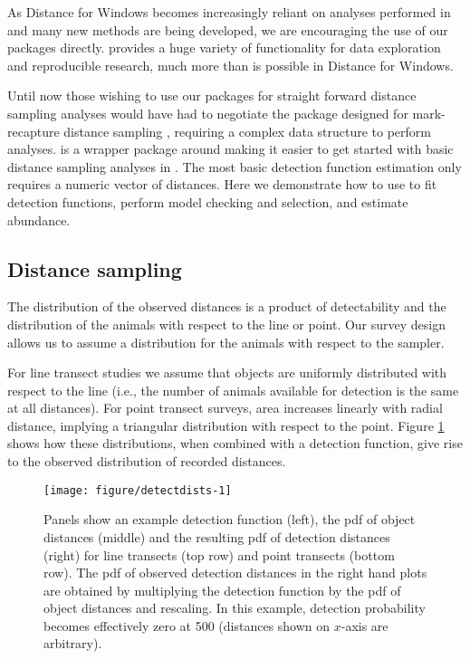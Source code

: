 \documentclass[article]{jss}\usepackage[]{graphicx}\usepackage[]{color}
\makeatletter
\def\maxwidth{ %
  \ifdim\Gin@nat@width>\linewidth
    \linewidth
  \else
    \Gin@nat@width
  \fi
}
\makeatother
\begin{document}
As Distance for Windows becomes increasingly reliant on analyses performed in  and many new methods are being developed, we are encouraging the use of our  packages directly.  provides a huge variety of functionality for data exploration and reproducible research, much more than is possible in Distance for Windows.

Until now those wishing to use our  packages for straight forward distance sampling analyses would have had to negotiate the package  \citep{mrds-pkg} designed for mark-recapture distance sampling \citep{Burt:2014gu}, requiring a complex data structure to perform analyses.  is a wrapper package around  making it easier to get started with basic distance sampling analyses in . The most basic detection function estimation only requires a numeric vector of distances. Here we demonstrate how to use  to fit detection functions, perform model checking and selection, and estimate abundance.


\subsection{Distance sampling}

The distribution of the observed distances is a product of detectability \citep[sometimes referred to as ``perception bias'';][]{Marsh:1989ho} and the distribution of the animals with respect to the line or point. Our survey design allows us to assume a distribution for the animals with respect to the sampler.

For line transect studies we assume that objects are uniformly distributed with respect to the line (i.e., the number of animals available for detection is the same at all distances). For point transect surveys, area increases linearly with radial distance, implying a triangular distribution with respect to the point. Figure \ref{fig:detectiondist} shows how these distributions, when combined with a detection function, give rise to the observed distribution of recorded distances.

\begin{figure}
\begin{center}
\begin{Schunk}

\texttt{[image: figure/detectdists-1]} \end{Schunk}
\caption{Panels show an example detection function (left), the pdf of object distances (middle) and the resulting pdf of detection distances (right) for line transects (top row) and point transects (bottom row). The pdf of observed detection distances in the right hand plots are obtained by multiplying the detection function by the pdf of object distances and rescaling. In this example, detection probability becomes effectively zero at 500 (distances shown on $x$-axis are arbitrary).}
\label{fig:detectiondist}
\end{center}
\end{figure}
\end{document}
